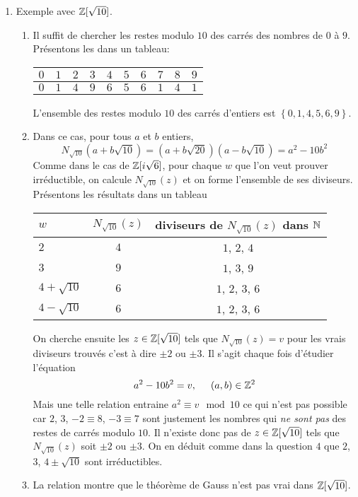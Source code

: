 \begin{enumerate}
  \item Exemple avec $\mathbb{Z}[\sqrt{10}]$.
  \begin{enumerate}
    \item Il suffit de chercher les restes modulo $10$ des carrés des nombres de $0$ à $9$. Présentons les dans un tableau:
    \begin{center}
\begin{tabular}{c|c|c|c|c|c|c|c|c|c|}
 $0$ & $1$ & $2$ & $3$ & $4$ & $5$ & $6$ & $7$ & $8$ & $9$\\ \hline
 $0$ & $1$ & $4$ & $9$ & $6$ & $5$ & $6$ & $1$ & $4$ & $1$
    \end{tabular}
    \end{center}
L'ensemble des restes modulo $10$ des carrés d'entiers est $\left\lbrace 0, 1, 4, 5, 6, 9\right\rbrace$. 
    
    \item Dans ce cas, pour tous $a$ et $b$ entiers,
  \begin{displaymath}
    N_{\sqrt{10}}(a+b\sqrt{10}) = (a+b\sqrt{20})(a-b\sqrt{10}) = a^2 -10 b^2
  \end{displaymath}
Comme dans le cas de $\mathbb{Z}[i\sqrt{6}]$, pour chaque $w$ que l'on veut prouver irréductible, on calcule $N_{\sqrt{10}}(z)$ et on forme l'ensemble de ses diviseurs. Présentons les résultats dans un tableau
\begin{center}
\vspace{0.2cm}
\begin{tabular}{l|c|c}
$w$ & $N_{\sqrt{10}}(z)$ & diviseurs de $N_{\sqrt{10}}(z)$ dans $\mathbb{N}$\\ \hline
$2$ & $4$                & $1$, $2$, $4$\\ \hline
$3$ & $9$                & $1$, $3$, $9$\\ \hline
$4+\sqrt{10}$            & $6$ & $1$, $2$, $3$, $6$\\ \hline
$4-\sqrt{10}$            & $6$ & $1$, $2$, $3$, $6$
\end{tabular}
\end{center}
On cherche ensuite les $z\in \mathbb{Z}[\sqrt{10}]$ tels que $N_{\sqrt{10}}(z)=v$ pour les \og vrais\fg~ diviseurs trouvés c'est à dire $\pm 2$ ou $\pm 3$. Il s'agit chaque fois d'étudier l'équation
\begin{displaymath}
  a^2 - 10 b^2 = v ,\hspace{0.5cm} (a,b)\in \mathbb{Z}^2
\end{displaymath}
Mais une telle relation entraine $a^2 \equiv v \mod 10$ ce qui n'est pas possible car $2$, $3$, $-2 \equiv 8$, $-3 \equiv 7$ sont justement les nombres qui \emph{ne sont pas} des restes de carrés modulo $10$.\newline
Il n'existe donc pas de $z\in \mathbb{Z}[\sqrt{10}]$ tels que $N_{\sqrt{10}}(z)$ soit $\pm2$ ou $\pm3$. On en déduit comme dans la question $4$ que $2$, $3$, $4\pm\sqrt{10}$ sont irréductibles.
  \item La relation montre que le théorème de Gauss n'est pas vrai dans $\mathbb{Z}[\sqrt{10}]$.
  \end{enumerate}

\end{enumerate}


